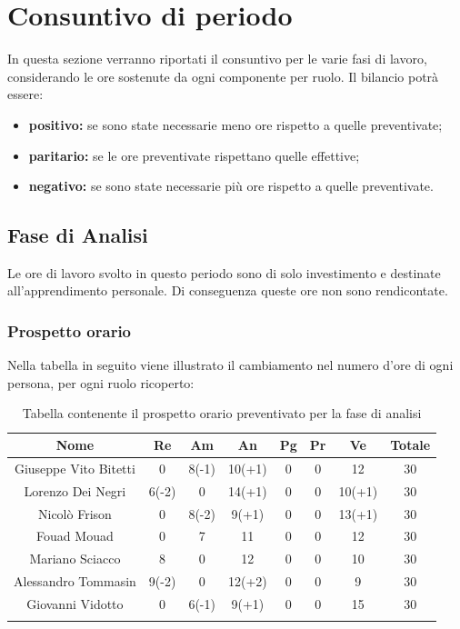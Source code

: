 \section{Consuntivo di periodo}
		In questa sezione verranno riportati il consuntivo per le varie fasi di lavoro, considerando le ore sostenute da ogni componente per ruolo. Il bilancio potrà essere:
		\begin{itemize}
			\item \textbf{positivo:} se sono state necessarie meno ore rispetto a quelle preventivate;	 
			\item \textbf{paritario:} se le ore preventivate rispettano quelle effettive;	 
			\item \textbf{negativo:} se sono state necessarie più ore rispetto a quelle preventivate.
		\end{itemize}
	\subsection{Fase di Analisi}
		Le ore di lavoro svolto in questo periodo sono di solo investimento e destinate all'apprendimento personale. Di conseguenza queste ore non sono rendicontate. 
		\subsubsection{Prospetto orario}
			Nella tabella in seguito viene illustrato il cambiamento nel numero d'ore di ogni persona, per ogni ruolo ricoperto:
			
			\begin{longtable}{|c|c|c|c|c|c|c|c}
				\hline
				\rowcolor{lighter-grayer}
				\textbf{Nome} & \textbf{Re} & \textbf{Am} & \textbf{An} & \textbf{Pg}  & \textbf{Pr}   & \textbf{Ve} & \textbf{Totale} \\
				\hline
				\endfirsthead
				
				\hline
				Giuseppe Vito Bitetti 		& 0 & 8(-1) & 10(+1) & 0 & 0 & 12 & 30\\
				\hline
				\hline
				Lorenzo Dei Negri			 & 6(-2) & 0 & 14(+1) & 0 & 0 & 10(+1) & 30\\
				\hline
				\hline
				Nicolò Frison 					& 0 & 8(-2) & 9(+1) & 0 & 0 & 13(+1) & 30\\
				\hline
				\hline
				Fouad Mouad 				& 0 & 7 & 11 & 0 & 0 & 12 & 30\\
				\hline
				\hline
				Mariano Sciacco 			& 8 & 0 & 12 & 0 & 0 & 10 & 30\\
				\hline
				\hline
				Alessandro Tommasin    & 9(-2) & 0 & 12(+2) & 0 & 0 & 9 & 30\\
				\hline
				\hline
				Giovanni Vidotto 			& 0 & 6(-1) & 9(+1) & 0 & 0 & 15 & 30\\
				\hline 
				\caption{Tabella contenente il prospetto orario preventivato per la fase di analisi}
			\end{longtable}
			\pagebreak	
			
